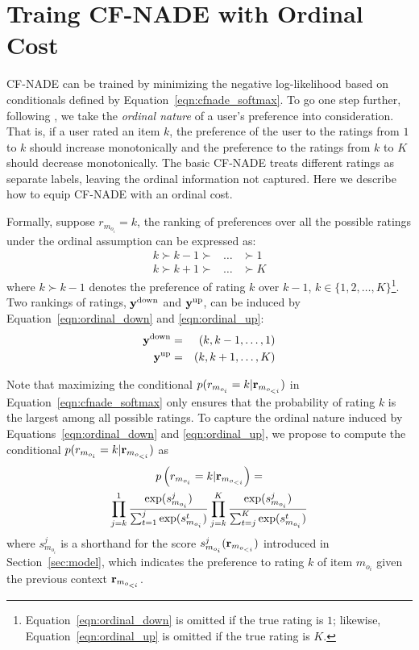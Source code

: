 \documentclass{article}
\newcommand{\cfnade}{CF-NADE\xspace}
\begin{document}
\section{Traing \cfnade with Ordinal Cost}
\label{sec:cost}



\cfnade can be trained by minimizing the negative log-likelihood based
on conditionals defined by Equation~\ref{eqn:cfnade_softmax}. To go
one step further, following \citet{phung2009ordinal}, we take the
\emph{ordinal nature} of a user's preference into consideration. That
is, if a user rated an item $k$, the preference of the user
to the ratings from $1$ to $k$ should increase monotonically and the
preference to the ratings from $k$ to $K$ should decrease
monotonically. The basic \cfnade treats different ratings as separate
labels, leaving the ordinal information not captured. Here we describe
how to equip \cfnade with an ordinal cost.

Formally, suppose $r_{m_{o_i}}=k$, the ranking of preferences over all
the possible ratings under the ordinal assumption can be expressed as:
\begin{eqnarray}
k \succ k-1 \succ &\ldots& \succ 1\label{eqn:ordinal_down} \\
k \succ k+1 \succ &\ldots& \succ K
\label{eqn:ordinal_up}
\end{eqnarray}
where $k \succ k-1$ denotes the preference of rating $k$ over $k-1$,
$k\in \{1,2,\ldots,K\}$\footnote{Equation~\ref{eqn:ordinal_down} is
  omitted if the true rating is $1$; likewise,
  Equation~\ref{eqn:ordinal_up} is omitted if the true rating is $K$.}.
Two rankings of ratings, ${\bf y}^{\textup{down}}$ and
${\bf y}^{\textup{up}}$, can be induced by
Equation~\ref{eqn:ordinal_down} and \ref{eqn:ordinal_up}:
\begin{eqnarray}
{\bf y}^{\textup{down}} &=& \left(k, k-1,\ldots , 1\right)\label{eqn:y_down} \\
{\bf y}^{\textup{up}} &=& \left(k, k+1,\ldots , K\right)\label{eqn:y_up}
\end{eqnarray}

Note that maximizing the conditional $p( r_{m_{o_i}}=k|{\bf r}_{m_{o_{<i}}})$ in Equation~\ref{eqn:cfnade_softmax} only ensures that the probability of rating $k$ is the largest among all possible ratings. To capture the ordinal nature induced by Equations~\ref{eqn:ordinal_down} and \ref{eqn:ordinal_up}, we propose to compute the conditional $p( r_{m_{o_i}}=k|{\bf r}_{m_{o_{<i}}})$ as
\begin{multline}
p\left( r_{m_{o_i}}=k|{\bf r}_{m_{o_{<i}}}\right)=\\
\prod_{j=k}^1 \frac{\exp(s_{m_{o_i}}^{j})}{\sum_{t=1}^j \exp(s_{m_{o_i}}^{t})}\prod_{j=k}^{K} \frac{\exp(s_{m_{o_i}}^{j})}{\sum_{t=j}^K \exp(s_{m_{o_i}}^{t})}
\label{eqn:ordinal_conditional}
\end{multline}
where $s_{m_{o_i}}^{j}$ is a shorthand for the score $s_{m_{o_i}}^{j}({\bf r}_{m_{o_{<i}}})$ introduced in Section~\ref{sec:model}, which indicates the preference to rating $k$ of item $m_{o_i}$ given the previous context ${\bf r}_{m_{o_{<i}}}$. 
\end{document}

